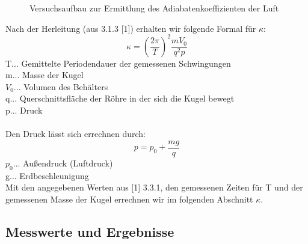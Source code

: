\documentclass[12pt,a4paper]{article}
\begin{document}
\begin{multicols}{2}
\begin{figure}[H]
	\caption{Versuchsaufbau zur Ermittlung des Adiabatenkoeffizienten der Luft}
	\label{fig:adiabatenkoeffizienten_aufbau}
\end{figure}
\noindent
Nach der Herleitung (aus 3.1.3 [1]) erhalten wir folgende Formal für $\kappa$:
$$\kappa = \left(\frac{2\pi}{T}\right)^2  \frac{m V_0}{q^2  p}$$
T... Gemittelte Periodendauer der gemessenen Schwingungen\\
m... Masse der Kugel\\
$V_0$... Volumen des Behälters\\
q... Querschnittsfläche der Röhre in der sich die Kugel bewegt\\
p... Druck\\
\\
Den Druck lässt sich errechnen durch:
$$p = p_0 + \frac{m g}{q}$$
$p_0$... Außendruck (Luftdruck)\\
g... Erdbeschleunigung\\
Mit den angegebenen Werten aus [1] 3.3.1, den gemessenen Zeiten für T und der gemessenen Masse der Kugel errechnen wir im folgenden Abschnitt $\kappa$.
%
\subsection{Messwerte und Ergebnisse}


\end{multicols}
\end{document}

